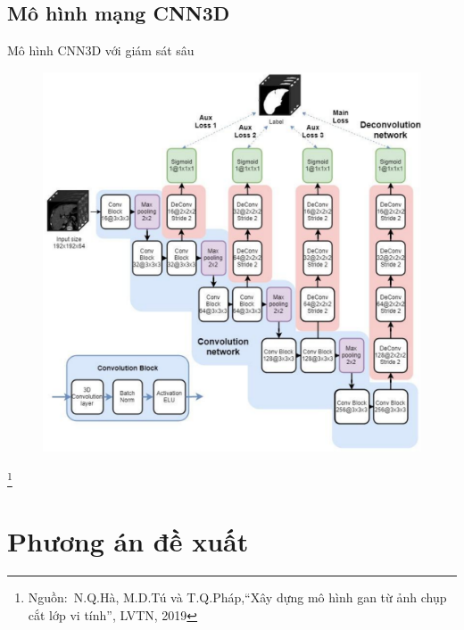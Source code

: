 \documentclass[
	10pt,                %
	aspectratio=169,     %
]{beamer}
\newcommand\footnotesource[1]{					%
	\vspace{-10mm}\let\thefootnote\relax\footnote{\hspace{-3mm}\tiny Nguồn:~#1}
}
\begin{document}
\subsection{Mô hình mạng CNN3D}
	\begin{frame}{Mô hình CNN3D với giám sát sâu}
	\vspace{2mm}
		\begin{figure}
			\centering
			\vspace{-0.8cm}
			\includegraphics[scale=0.4]{Presentation_template/figures/cnn3d1.pdf}
        \end{figure}
		\footnotesource{N.Q.Hà, M.D.Tú và T.Q.Pháp,``Xây dựng mô hình gan từ ảnh chụp cắt lớp vi tính'', LVTN, 2019} 
	\end{frame}



\section{Phương án đề xuất}
\end{document}
